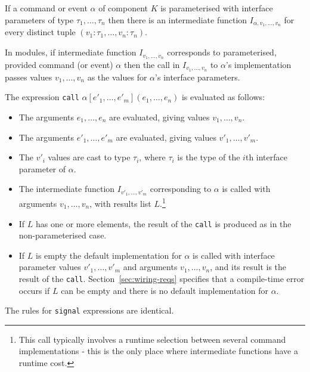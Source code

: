 \documentclass[11pt,letterpaper]{article}
\newcommand{\code}[1]{{\tt #1}}
\begin{document}
If a command or event $\alpha$ of component $K$ is parameterised with
interface parameters of type $\tau_1, \ldots, \tau_n$ then there is an
intermediate function $I_{\alpha,v_1,\ldots,v_n}$ for every distinct tuple
$(v_1:\tau_1, \ldots, v_n:\tau_n)$.

In modules, if intermediate function $I_{v_1, \ldots, v_n}$ corresponds
to parameterised, provided command (or event) $\alpha$ then the call in
$I_{v_1, \ldots, v_n}$ to $\alpha$'s implementation passes values $v_1,
\ldots, v_n$ as the values for $\alpha$'s interface parameters. 

The expression \code{call} $\alpha[e'_1, \ldots, e'_m](e_1, \ldots, e_n)$
is evaluated as follows:
\begin{itemize}
\item The arguments $e_1, \ldots, e_n$ are evaluated, giving values $v_1,
\ldots, v_n$.
\item The arguments $e'_1, \ldots, e'_m$ are evaluated, giving values $v'_1,
\ldots, v'_m$.
\item The $v'_i$ values are cast to type $\tau_i$, where $\tau_i$ is the
type of the $i$th interface parameter of $\alpha$.
\item The intermediate function $I_{v'_1,\ldots,v'_m}$ corresponding to
$\alpha$ is called with arguments $v_1, \ldots, v_n$, with results list
$L$.\footnote{This call typically involves a runtime selection between
several command implementations - this is the only place where intermediate
functions have a runtime cost.}
\item If $L$ has one or more elements, the result of the \code{call} is
produced as in the non-parameterised case.
\item If $L$ is empty the default implementation for $\alpha$ is called
with interface parameter values $v'_1, \ldots, v'_m$ and arguments $v_1,
\ldots, v_n$, and its result is the result of the
\code{call}. Section~\ref{sec:wiring-reqs} specifies that a compile-time
error occurs if $L$ can be empty and there is no default implementation for
$\alpha$.
\end{itemize}
The rules for \code{signal} expressions are identical.
\end{document}
